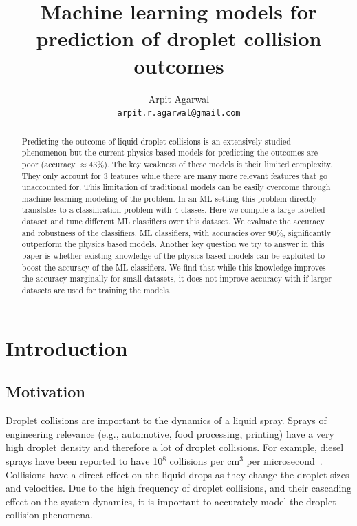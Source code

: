 \documentclass{article}
\title{Machine learning models for prediction of droplet collision outcomes}
\author{
  Arpit Agarwal \\
  \texttt{arpit.r.agarwal@gmail.com} \\
}
\begin{document}

\maketitle

\begin{abstract}
Predicting the outcome of liquid droplet collisions is an extensively studied phenomenon but the current physics based models for predicting the outcomes are poor (accuracy $\approx 43\%$). The key weakness of these models is their limited complexity. They only account for 3 features while there are many more relevant features that go unaccounted for. This limitation of traditional models can be easily overcome through machine learning modeling of the problem. In an ML setting this problem directly translates to a classification problem with 4 classes. Here we compile a large labelled dataset and tune different ML classifiers over this dataset. We evaluate the accuracy and robustness of the classifiers. ML classifiers, with accuracies over 90\%, significantly outperform the physics based models. Another key question we try to answer in this paper is whether existing knowledge of the physics based models can be exploited to boost the accuracy of the ML classifiers. We find that while this knowledge improves the accuracy marginally for small datasets, it does not improve accuracy with if larger datasets are used for training the models.
\end{abstract}

\section{Introduction}
\subsection{Motivation}
Droplet collisions are important to the dynamics of a liquid spray. Sprays of engineering relevance (e.g., automotive, food processing, printing) have a very high droplet density and therefore a lot of droplet collisions. For example, diesel sprays have been reported to have 10$^8$ collisions per cm$^3$ per microsecond~\cite{macinnes1991comparisons}. Collisions have a direct effect on the liquid drops as they change the droplet sizes and velocities. Due to the high frequency of droplet collisions, and their cascading effect on the system dynamics, it is important to accurately model the droplet collision phenomena.
\end{document}
